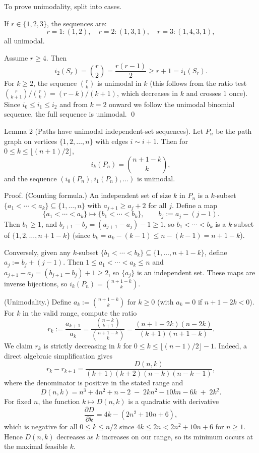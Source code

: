 To prove unimodality, split into cases.

If $r\in\{1,2,3\}$, the sequences are:
\[
 r=1: (1,2),\quad r=2:(1,3,1),\quad r=3:(1,4,3,1),
\]
all unimodal.

Assume $r\ge 4$.  Then
\[
 i_2(S_r)=\binom{r}{2}=\frac{r(r-1)}{2} \ge r+1 = i_1(S_r).
\]
For $k\ge 2$, the sequence $\binom{r}{k}$ is unimodal in $k$ (this follows from the ratio test $\binom{r}{k+1}/\binom{r}{k}=(r-k)/(k+1)$, which decreases in $k$ and crosses $1$ once).  Since $i_0\le i_1\le i_2$ and from $k=2$ onward we follow the unimodal binomial sequence, the full sequence is unimodal.  \qed

Lemma 2 (Paths have unimodal independent-set sequences).
Let $P_n$ be the path graph on vertices $\{1,2,\dots,n\}$ with edges $i\sim i+1$.  Then for $0\le k\le \lfloor (n+1)/2\rfloor$,
\[
 i_k(P_n)=\binom{n+1-k}{k},
\]
and the sequence $(i_0(P_n),i_1(P_n),\dots)$ is unimodal.

Proof.
(Counting formula.)  An independent set of size $k$ in $P_n$ is a $k$-subset $\{a_1<\cdots<a_k\}\subseteq\{1,\dots,n\}$ with $a_{j+1}\ge a_j+2$ for all $j$.  Define a map
\[
\{a_1<\cdots<a_k\} \mapsto \{b_1<\cdots<b_k\},\qquad b_j:=a_j-(j-1).
\]
Then $b_1\ge 1$, and $b_{j+1}-b_j=(a_{j+1}-a_j)-1\ge 1$, so $b_1<\cdots<b_k$ is a $k$-subset of $\{1,2,\dots,n+1-k\}$ (since $b_k=a_k-(k-1)\le n-(k-1)=n+1-k$).

Conversely, given any $k$-subset $\{b_1<\cdots<b_k\}\subseteq\{1,\dots,n+1-k\}$, define $a_j:=b_j+(j-1)$.  Then $1\le a_1<\cdots<a_k\le n$ and $a_{j+1}-a_j=(b_{j+1}-b_j)+1\ge 2$, so $\{a_j\}$ is an independent set.  These maps are inverse bijections, so
$i_k(P_n)=\binom{n+1-k}{k}$.

(Unimodality.)  Define $a_k:=\binom{n+1-k}{k}$ for $k\ge 0$ (with $a_k=0$ if $n+1-2k<0$).  For $k$ in the valid range, compute the ratio
\[
 r_k:=\frac{a_{k+1}}{a_k} = \frac{\binom{n-k}{k+1}}{\binom{n+1-k}{k}}
 = \frac{(n+1-2k)(n-2k)}{(k+1)(n+1-k)}.
\]
We claim $r_k$ is strictly decreasing in $k$ for $0\le k\le \lfloor (n-1)/2\rfloor-1$.  Indeed, a direct algebraic simplification gives
\[
 r_k-r_{k+1} = \frac{D(n,k)}{(k+1)(k+2)(n-k)(n-k-1)},
\]
where the denominator is positive in the stated range and
\[
 D(n,k)=n^3+4n^2+n-2\; -\; 2k n^2 - 10k n - 6k\; +\; 2k^2.
\]
For fixed $n$, the function $k\mapsto D(n,k)$ is a quadratic with derivative
\[
 \frac{\partial D}{\partial k}=4k-(2n^2+10n+6),
\]
which is negative for all $0\le k\le n/2$ since $4k\le 2n<2n^2+10n+6$ for $n\ge 1$.  Hence $D(n,k)$ decreases as $k$ increases on our range, so its minimum occurs at the maximal feasible $k$.

